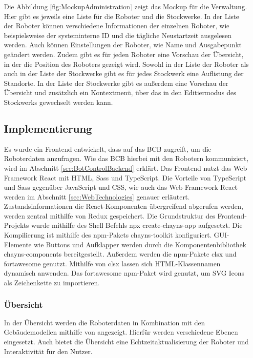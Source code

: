 Die Abbildung \ref{fig:MockupAdministration} zeigt das \gls{Mockup} für die Verwaltung. Hier gibt es jeweils eine Liste für die Roboter und die Stockwerke. In der Liste der Roboter können verschiedene Informationen der einzelnen Roboter, wie beispielsweise der systeminterne \ac{ID} und die tägliche Neustartzeit ausgelesen werden. Auch können Einstellungen der Roboter, wie Name und Ausgabepunkt geändert werden. Zudem gibt es für jeden Roboter eine Vorschau der Übersicht, in der die Position des Roboters gezeigt wird. Sowohl in der Liste der Roboter als auch in der Liste der Stockwerke gibt es für jedes Stockwerk eine Auflistung der Standorte. In der Liste der Stockwerke gibt es außerdem eine Vorschau der Übersicht und zusätzlich ein Kontextmenü, über das in den Editiermodus des Stockwerks gewechselt werden kann.

\subsection{Implementierung}
Es wurde ein Frontend entwickelt, dass auf das \ac{BCB} zugreift, um die Roboterdaten anzufragen. Wie das \ac{BCB} hierbei mit den Robotern kommuniziert, wird im Abschnitt \ref{sec:BotControlBackend} erklärt. Das Frontend nutzt das Web-Framework React mit \ac{HTML}, \ac{Sass} und TypeScript. Die Vorteile von TypeScript und \ac{Sass} gegenüber JavaScript und \ac{CSS}, wie auch das Web-Framework React werden im Abschnitt \ref{sec:WebTechnologies} genauer erläutert. Zustandsinformationen die React-Komponenten übergreifend abgerufen werden, werden zentral mithilfe von Redux gespeichert. Die Grundstruktur des Frontend-Projekts wurde mithilfe des Shell Befehls npx create-chayns-app \cite{CreateChaynsApp} aufgesetzt. Die Kompilierung ist mithilfe des \ac{npm}-Pakets chayns-toolkit \cite{ChaynsToolkit} konfiguriert. \ac{GUI}-Elemente wie Buttons und Aufklapper werden durch die Komponentenbibliothek chayns-components \cite{ChaynsComponents} bereitgestellt. Außerdem werden die \ac{npm}-Pakete clsx \cite{clsx} und fortawesome \cite{fontawesome} genutzt. Mithilfe von clsx lassen sich \ac{HTML}-Klassennamen dynamisch anwenden. Das fortawesome \ac{npm}-Paket wird genutzt, um \ac{SVG} Icons als Zeichenkette zu importieren.

\subsubsection{Übersicht}
In der Übersicht werden die Roboterdaten in Kombination mit den Gebäudemodellen mithilfe von \deckgl{} angezeigt. Hierfür werden verschiedene Ebenen eingesetzt. Auch bietet die Übersicht eine Echtzeitaktualisierung der Roboter und Interaktivität für den Nutzer.

